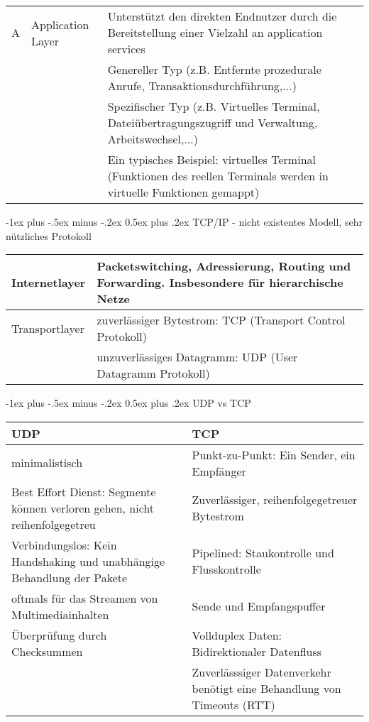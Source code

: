 \documentclass[10pt,landscape]{article}
\makeatletter
\renewcommand{\section}{\@startsection{section}{1}{0mm}%
                                {-1ex plus -.5ex minus -.2ex}%
                                {0.5ex plus .2ex}%
                                {\normalfont\large\bfseries}}
\makeatother
\begin{document}
\begin{tabular}{l | l | l}
        \hline
    A & Application Layer &
        Unterstützt den direkten Endnutzer durch die Bereitstellung einer Vielzahl an application services\\
        &&Genereller Typ (z.B. Entfernte prozedurale Anrufe, Transaktionsdurchführung,...)\\
        &&Spezifischer Typ (z.B. Virtuelles Terminal, Dateiübertragungszugriff und Verwaltung, Arbeitswechsel,...)\\
        &&Ein typisches Beispiel: virtuelles Terminal (Funktionen des reellen Terminals werden in virtuelle Funktionen gemappt)\\
\end{tabular}

\section{TCP/IP - nicht existentes Modell, sehr nützliches Protokoll}
\begin{tabular}{l | l}
    Internetlayer & Packetswitching, Adressierung, Routing und Forwarding. Insbesondere für hierarchische Netze \\
    \hline
    Transportlayer & zuverlässiger Bytestrom: TCP (Transport Control Protokoll) \\
        & unzuverlässiges Datagramm: UDP (User Datagramm Protokoll)\\
\end{tabular}

\section{UDP vs TCP}
\begin{tabular}{l | l}
    UDP & TCP \\ \hline
    minimalistisch & Punkt-zu-Punkt: Ein Sender, ein Empfänger \\
    Best Effort Dienst: Segmente können verloren gehen, nicht reihenfolgegetreu & Zuverlässiger, reihenfolgegetreuer Bytestrom \\
    Verbindungslos: Kein Handshaking und unabhängige Behandlung der Pakete & Pipelined: Staukontrolle und Flusskontrolle \\
    oftmals für das Streamen von Multimediainhalten & Sende und Empfangspuffer \\
    Überprüfung durch Checksummen & Vollduplex Daten: Bidirektionaler Datenfluss \\
    & Zuverlässsiger Datenverkehr benötigt eine Behandlung von Timeouts (RTT) \\
\end{tabular}
\end{document}
